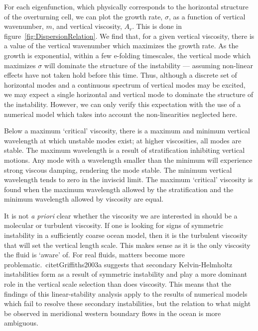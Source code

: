 For each eigenfunction, which physically corresponds to the horizontal structure of the overturning cell, we can plot the growth rate, $\sigma$, as a function of vertical wavenumber, $m$, and vertical viscosity, $A_r$. This is done in figure~\ref{fig:DispersionRelation}. We find that, for a given vertical viscosity, there is a value of the vertical wavenumber which maximizes the growth rate. As the growth is exponential, within a few e-folding timescales, the vertical mode which maximizes $\sigma$ will dominate the structure of the instability --- assuming non-linear effects have not taken hold before this time. Thus, although a discrete set of horizontal modes and a continuous spectrum of vertical modes may be excited, we may expect a single horizontal and vertical mode to dominate the structure of the instability. However, we can only verify this expectation with the use of a numerical model which takes into account the non-linearities neglected here.

Below a maximum `critical' viscosity, there is a maximum and minimum vertical wavelength at which unstable modes exist; at higher viscosities, all modes are stable. The maximum wavelength is a result of stratification inhibiting vertical motions. Any mode with a wavelength smaller than the minimum will experience strong viscous damping, rendering the mode stable. The minimum vertical wavelength tends to zero in the inviscid limit. The maximum `critical' viscosity is found when the maximum wavelength allowed by the stratification and the minimum wavelength allowed by viscosity are equal.

It is not \textit{a priori} clear whether the viscosity we are interested in should be a molecular or turbulent viscosity. If one is looking for signs of symmetric instability in a sufficiently coarse ocean model, then it is the turbulent viscosity that will set the vertical length scale. This makes sense as it is the only viscosity the fluid is `aware' of. For real fluids, matters become more problematic.~citet{Griffiths2003a} suggests that secondary Kelvin-Helmholtz instabilities form as a result of symmetric instability and play a more dominant role in the vertical scale selection than does viscosity. This means that the findings of this linear-stability analysis apply to the results of numerical models which fail to resolve these secondary instabilities, but the relation to what might be observed in meridional western boundary flows in the ocean is more ambiguous.


